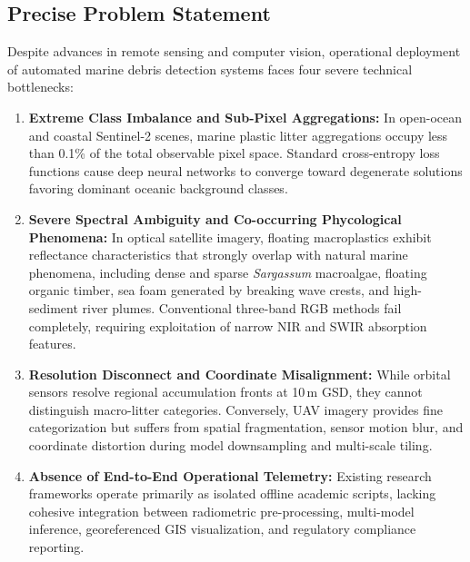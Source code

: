 \documentclass[conference]{IEEEtran}
\begin{document}
\subsection{Precise Problem Statement}
Despite advances in remote sensing and computer vision, operational deployment of automated marine debris detection systems faces four severe technical bottlenecks:
\begin{enumerate}
    \item \textbf{Extreme Class Imbalance and Sub-Pixel Aggregations:} In open-ocean and coastal Sentinel-2 scenes, marine plastic litter aggregations occupy less than 0.1\% of the total observable pixel space. Standard cross-entropy loss functions cause deep neural networks to converge toward degenerate solutions favoring dominant oceanic background classes.
    \item \textbf{Severe Spectral Ambiguity and Co-occurring Phycological Phenomena:} In optical satellite imagery, floating macroplastics exhibit reflectance characteristics that strongly overlap with natural marine phenomena, including dense and sparse \textit{Sargassum} macroalgae, floating organic timber, sea foam generated by breaking wave crests, and high-sediment river plumes. Conventional three-band RGB methods fail completely, requiring exploitation of narrow NIR and SWIR absorption features.
    \item \textbf{Resolution Disconnect and Coordinate Misalignment:} While orbital sensors resolve regional accumulation fronts at 10\,m GSD, they cannot distinguish macro-litter categories. Conversely, UAV imagery provides fine categorization but suffers from spatial fragmentation, sensor motion blur, and coordinate distortion during model downsampling and multi-scale tiling.
    \item \textbf{Absence of End-to-End Operational Telemetry:} Existing research frameworks operate primarily as isolated offline academic scripts, lacking cohesive integration between radiometric pre-processing, multi-model inference, georeferenced GIS visualization, and regulatory compliance reporting.
\end{enumerate}
\end{document}

